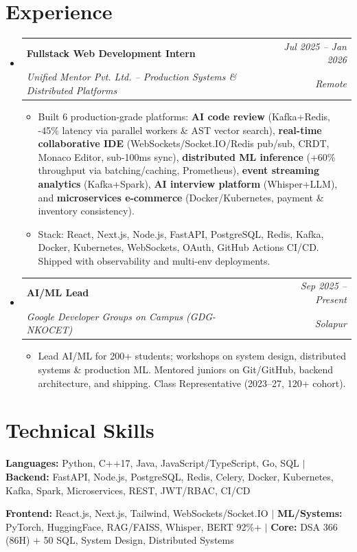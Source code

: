 \documentclass[letterpaper,10pt]{article}
\makeatletter
\newcommand{\resumeItem}[1]{\item\small{#1 \vspace{-1pt}}}
\newcommand{\resumeSubheading}[4]{
  \vspace{-2pt}\item
    \begin{tabular*}{0.97\textwidth}[t]{l@{\extracolsep{\fill}}r}
      \textbf{#1} & \textit{\small #2} \\
      \textit{\small#3} & \textit{\small #4}
    \end{tabular*}\vspace{-5pt}
}
\newcommand{\resumeSubHeadingListStart}{\begin{itemize}[leftmargin=0.15in, label={}]}
\newcommand{\resumeSubHeadingListEnd}{\end{itemize}\vspace{-2pt}}
\newcommand{\resumeItemListStart}{\begin{itemize}[leftmargin=15pt,itemsep=0pt,parsep=0pt,topsep=1pt]}
\newcommand{\resumeItemListEnd}{\end{itemize}\vspace{-4pt}}
\makeatother
\begin{document}
\section{Experience}
\resumeSubHeadingListStart
\resumeSubheading
  {Fullstack Web Development Intern}{Jul 2025 -- Jan 2026}
  {Unified Mentor Pvt. Ltd. -- Production Systems \& Distributed Platforms}{Remote}
  \resumeItemListStart
    \resumeItem{Built 6 production-grade platforms: \textbf{AI code review} (Kafka+Redis, -45\% latency via parallel workers \& AST vector search), \textbf{real-time collaborative IDE} (WebSockets/Socket.IO/Redis pub/sub, CRDT, Monaco Editor, sub-100ms sync), \textbf{distributed ML inference} (+60\% throughput via batching/caching, Prometheus), \textbf{event streaming analytics} (Kafka+Spark), \textbf{AI interview platform} (Whisper+LLM), and \textbf{microservices e-commerce} (Docker/Kubernetes, payment \& inventory consistency).}
    \resumeItem{Stack: React, Next.js, Node.js, FastAPI, PostgreSQL, Redis, Kafka, Docker, Kubernetes, WebSockets, OAuth, GitHub Actions CI/CD. Shipped with observability and multi-env deployments.}
  \resumeItemListEnd
\resumeSubheading
  {AI/ML Lead}{Sep 2025 -- Present}
  {Google Developer Groups on Campus (GDG-NKOCET)}{Solapur}
  \resumeItemListStart
    \resumeItem{Lead AI/ML for 200+ students; workshops on system design, distributed systems \& production ML. Mentored juniors on Git/GitHub, backend architecture, and shipping. Class Representative (2023--27, 120+ cohort).}
  \resumeItemListEnd
\resumeSubHeadingListEnd

\section{Technical Skills}
\begin{itemize}[leftmargin=0.15in, label={}, itemsep=1pt]
  \small{
  \item{\textbf{Languages:} Python, C++17, Java, JavaScript/TypeScript, Go, SQL \hspace{6pt}$|$\hspace{6pt} \textbf{Backend:} FastAPI, Node.js, PostgreSQL, Redis, Celery, Docker, Kubernetes, Kafka, Spark, Microservices, REST, JWT/RBAC, CI/CD}
  \item{\textbf{Frontend:} React.js, Next.js, Tailwind, WebSockets/Socket.IO \hspace{6pt}$|$\hspace{6pt} \textbf{ML/Systems:} PyTorch, HuggingFace, RAG/FAISS, Whisper, BERT 92\%+ \hspace{6pt}$|$\hspace{6pt} \textbf{Core:} DSA 366 (86H) + 50 SQL, System Design, Distributed Systems}
  }
\end{itemize}
\end{document}
